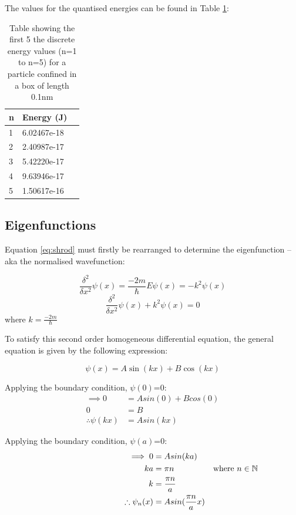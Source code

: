 The values for the quantised energies can be found in Table \ref{tab:qEnerergy}:

\begin{table}[h!]
\centering
\begin{tabular}{|l|l|l|}
\hline
\textbf{n} & \textbf{Energy (J)} \\ \hline
1 & 6.02467e-18 \\ \hline
2 & 2.40987e-17 \\ \hline
3 & 5.42220e-17 \\ \hline
4 & 9.63946e-17 \\ \hline
5 & 1.50617e-16 \\ \hline
\end{tabular}
\caption{Table showing the first 5 the discrete energy values (n=1 to n=5) for a particle confined in a box of length 0.1nm}
\label{tab:qEnerergy}
\end{table}

\subsection{Eigenfunctions}\label{sec:eigenFunction}
Equation \ref{eq:shrod} must firstly be rearranged to determine the eigenfunction -- aka the normalised wavefunction:

$$\frac{\delta^{2}}{\delta x^{2}}\psi (x) = \frac{-2m}{\hbar} E \psi (x) = -k^2 \psi (x)$$
$$\frac{\delta^{2}}{\delta x^{2}}\psi (x) + k^2 \psi (x) = 0$$
where $k=\frac{-2m}{\hbar}$

To satisfy this second order homogeneous differential equation, the general equation is given by the following expression:

$$\psi (x) = A \sin(kx) + B \cos(kx)$$

Applying the boundary condition, $\psi (0)$=0:
\begin{align*}
\implies 0 &= A sin(0) + B cos(0)\\
 0 &= B\\
\therefore \psi (kx) &= A sin(kx)
\end{align*}

Applying the boundary condition, $\psi (a)$=0:
\begin{align*}
\hspace{3.5cm} \implies 0 &= A sin(ka)\\
ka &= \pi n & \text{where } n \in \mathbb{N}\\
k &= \frac{\pi n}{a}\\
\therefore \psi_n (x) &= A sin(\frac{\pi n}{a}x)
\end{align*}

